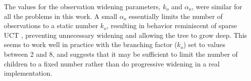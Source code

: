 The values for the observation widening parameters, $k_o$ and $\alpha_o$, were similar for all the problems in this work.
A small $\alpha_o$ essentially limits the number of observations to a static number $k_o$, resulting in behavior reminiscent of sparse UCT \cite{browne2012survey}, preventing unnecessary widening and allowing the tree to grow deep.
This seems to work well in practice with the branching factor ($k_o$) set to values between \num{2} and \num{8}, and suggests that it may be sufficient to limit the number of children to a fixed number rather than do progressive widening in a real implementation.


